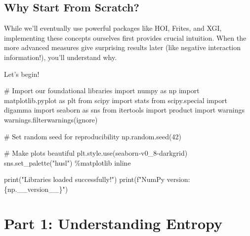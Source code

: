 \documentclass[
  11pt,
  letterpaper,
  oneside,
  openany]{book}
\newenvironment{Shaded}{\begin{snugshade}}{\end{snugshade}}
\newcommand{\BuiltInTok}[1]{\textcolor[rgb]{0.00,0.23,0.31}{#1}}
\newcommand{\CommentTok}[1]{\textcolor[rgb]{0.37,0.37,0.37}{#1}}
\newcommand{\DecValTok}[1]{\textcolor[rgb]{0.68,0.00,0.00}{#1}}
\newcommand{\ImportTok}[1]{\textcolor[rgb]{0.00,0.46,0.62}{#1}}
\newcommand{\NormalTok}[1]{\textcolor[rgb]{0.00,0.23,0.31}{#1}}
\newcommand{\OperatorTok}[1]{\textcolor[rgb]{0.37,0.37,0.37}{#1}}
\newcommand{\SpecialCharTok}[1]{\textcolor[rgb]{0.37,0.37,0.37}{#1}}
\newcommand{\SpecialStringTok}[1]{\textcolor[rgb]{0.13,0.47,0.30}{#1}}
\newcommand{\StringTok}[1]{\textcolor[rgb]{0.13,0.47,0.30}{#1}}
\begin{document}
\subsection{Why Start From Scratch?}\label{why-start-from-scratch}

While we'll eventually use powerful packages like HOI, Frites, and XGI,
implementing these concepts ourselves first provides crucial intuition.
When the more advanced measures give surprising results later (like
negative interaction information!), you'll understand why.

Let's begin!

\begin{Shaded}
\begin{Highlighting}[]
\CommentTok{\# Import our foundational libraries}
\ImportTok{import}\NormalTok{ numpy }\ImportTok{as}\NormalTok{ np}
\ImportTok{import}\NormalTok{ matplotlib.pyplot }\ImportTok{as}\NormalTok{ plt}
\ImportTok{from}\NormalTok{ scipy }\ImportTok{import}\NormalTok{ stats}
\ImportTok{from}\NormalTok{ scipy.special }\ImportTok{import}\NormalTok{ digamma}
\ImportTok{import}\NormalTok{ seaborn }\ImportTok{as}\NormalTok{ sns}
\ImportTok{from}\NormalTok{ itertools }\ImportTok{import}\NormalTok{ product}
\ImportTok{import}\NormalTok{ warnings}
\NormalTok{warnings.filterwarnings(}\StringTok{\textquotesingle{}ignore\textquotesingle{}}\NormalTok{)}

\CommentTok{\# Set random seed for reproducibility}
\NormalTok{np.random.seed(}\DecValTok{42}\NormalTok{)}

\CommentTok{\# Make plots beautiful}
\NormalTok{plt.style.use(}\StringTok{\textquotesingle{}seaborn{-}v0\_8{-}darkgrid\textquotesingle{}}\NormalTok{)}
\NormalTok{sns.set\_palette(}\StringTok{"husl"}\NormalTok{)}
\OperatorTok{\%}\NormalTok{matplotlib inline}

\BuiltInTok{print}\NormalTok{(}\StringTok{"Libraries loaded successfully!"}\NormalTok{)}
\BuiltInTok{print}\NormalTok{(}\SpecialStringTok{f"NumPy version: }\SpecialCharTok{\{}\NormalTok{np}\SpecialCharTok{.}\NormalTok{\_\_version\_\_}\SpecialCharTok{\}}\SpecialStringTok{"}\NormalTok{)}
\end{Highlighting}
\end{Shaded}

\section{Part 1: Understanding
Entropy}\label{part-1-understanding-entropy}
\end{document}
